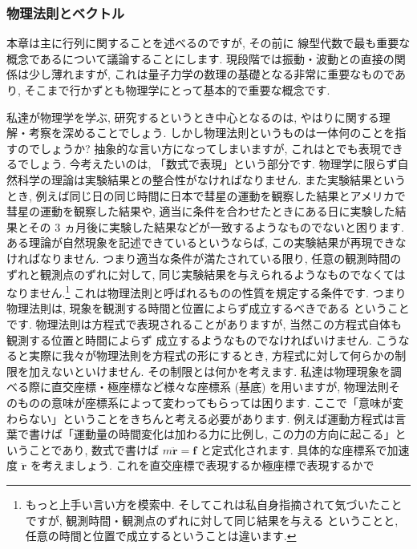\documentclass[openany, a4paper, oneside]{jsbook}
\begin{document}
\subsubsection{物理法則とベクトル}

本章は主に行列に関することを述べるのですが, その前に
線型代数で最も重要な概念であるについて議論することにします.
現段階では振動・波動との直接の関係は少し薄れますが,
これは量子力学の数理の基礎となる非常に重要なものであり,
そこまで行かずとも物理学にとって基本的で重要な概念です.

私達が物理学を学ぶ, 研究するというとき中心となるのは,
やはりに関する理解・考察を深めることでしょう.
しかし物理法則というものは一体何のことを指すのでしょうか?
抽象的な言い方になってしまいますが,
これはとでも表現できるでしょう.
今考えたいのは, 「数式で表現」という部分です.
物理学に限らず自然科学の理論は実験結果との整合性がなければなりません.
また実験結果というとき, 例えば同じ日の同じ時間に日本で彗星の運動を観察した結果とアメリカで彗星の運動を観察した結果や,
適当に条件を合わせたときにある日に実験した結果とその 3 ヵ月後に実験した結果などが一致するようなものでないと困ります.
ある理論が自然現象を記述できているというならば, この実験結果が再現できなければなりません.
つまり適当な条件が満たされている限り,
任意の観測時間のずれと観測点のずれに対して, 同じ実験結果を与えられるようなものでなくてはなりません.\footnote{もっと上手い言い方を模索中.
そしてこれは私自身指摘されて気づいたことですが, 観測時間・観測点のずれに対して同じ結果を与える
ということと, 任意の時間と位置で成立するということは違います.}
これは物理法則と呼ばれるものの性質を規定する条件です.
つまり物理法則は, 現象を観測する時間と位置によらず成立するべきである
ということです.
物理法則は方程式で表現されることがありますが, 当然この方程式自体も観測する位置と時間によらず
成立するようなものでなければいけません.
こうなると実際に我々が物理法則を方程式の形にするとき, 方程式に対して何らかの制限を加えないといけません.
その制限とは何かを考えます.
私達は物理現象を調べる際に直交座標・極座標など様々な座標系 (基底) を用いますが,
物理法則そのものの意味が座標系によって変わってもらっては困ります.
ここで「意味が変わらない」ということをきちんと考える必要があります.
例えば運動方程式は言葉で書けば「運動量の時間変化は加わる力に比例し, この力の方向に起こる」ということであり,
数式で書けば
 $m \ddot{ \bm {r} } = \bm{f}$
と定式化されます.
具体的な座標系で加速度 $\ddot{ \bm {r} }$ を考えましょう.
これを直交座標で表現するか極座標で表現するかで
\end{document}
